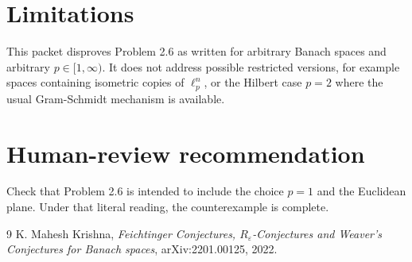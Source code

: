 \documentclass[11pt]{article}
\begin{document}
\section*{Limitations}

This packet disproves Problem 2.6 as written for arbitrary Banach spaces and
arbitrary $p\in[1,\infty)$.  It does not address possible restricted versions,
for example spaces containing isometric copies of $\ell_p^n$, or the Hilbert
case $p=2$ where the usual Gram-Schmidt mechanism is available.

\section*{Human-review recommendation}

Check that Problem 2.6 is intended to include the choice $p=1$ and the
Euclidean plane.  Under that literal reading, the counterexample is complete.

\begin{thebibliography}{9}
K. Mahesh Krishna,
\emph{Feichtinger Conjectures, $R_\varepsilon$-Conjectures and Weaver's
Conjectures for Banach spaces},
arXiv:2201.00125, 2022.
\end{thebibliography}
\end{document}

